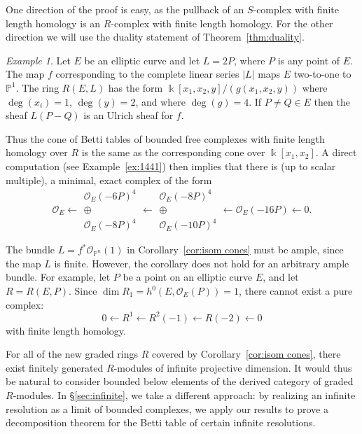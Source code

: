 \documentclass[12pt]{amsart}
\theoremstyle{definition}
\theoremstyle{remark}
\newtheorem{example}[lemma]{Example}
\newcommand{\kk}{\Bbbk}
\newcommand{\PP}{\mathbb{P}}
\newcommand{\cO}{\mathcal{O}}
\renewcommand{\P}{{\mathbb P}}
\begin{document}
One direction of the proof is easy, as the pullback of an $S$-complex with finite length homology is an $R$-complex with finite length homology.  For the other direction we will use the duality statement of Theorem~\ref{thm:duality}.

\begin{example}\label{ex:elliptic}
Let $E$ be an elliptic curve and let $L=2P$, where $P$ is any point of $E$.  The map $f$ corresponding to the complete
linear series $|L|$ maps $E$ two-to-one to $\P^{1}$. The ring $R(E,L)$ has the form
$\kk[x_1,x_2,y]/(g(x_{1},x_{2},y))$  where $\deg(x_i)=1$, $\deg(y)=2$, and where $\deg(g)=4$.
If $P\neq Q\in E$ then the sheaf $L(P-Q)$ is an Ulrich sheaf for $f$. 

Thus the cone of
Betti tables of bounded free complexes with finite length homology over $R$ is the same
as the corresponding cone over $\kk[x_1,x_2]$.  A direct computation (see Example~\ref{ex:1441}) then implies that there is (up to scalar multiple), a minimal, exact complex of the form
\[
\cO_E\longleftarrow \begin{matrix}  \cO_E(-6P)^4\\ \oplus\\ \cO_E(-8P)^4\end{matrix}\longleftarrow \begin{matrix}  \cO_E(-8P)^4\\ \oplus\\ \cO_E(-10P)^4\end{matrix} \longleftarrow \cO_E(-16P)\longleftarrow 0.
\]
\end{example}

The bundle $L=f^*\cO_{\PP^n}(1)$ in Corollary~\ref{cor:isom cones} must be ample, since the map $L$ is finite.  However, the corollary does not hold for an arbitrary ample bundle.  For example, let $P$ be a point on an elliptic curve $E$, and let $R=R(E,P)$.  Since $\dim R_1=h^0(E,\cO_E(P))=1$, there cannot exist a pure complex:
\[
0\gets R^1\gets R^2(-1)\gets R(-2)\gets 0
\]
with finite length homology.

For all of the new graded rings $R$ covered by Corollary~\ref{cor:isom cones}, there exist finitely generated $R$-modules of infinite projective dimension.  It would thus be natural to consider bounded below elements of the derived category of graded $R$-modules.  In \S\ref{sec:infinite}, we take a different approach: by realizing an infinite resolution as a limit of bounded complexes, we apply our results to prove a decomposition theorem for the Betti table of certain infinite resolutions.
\end{document}
